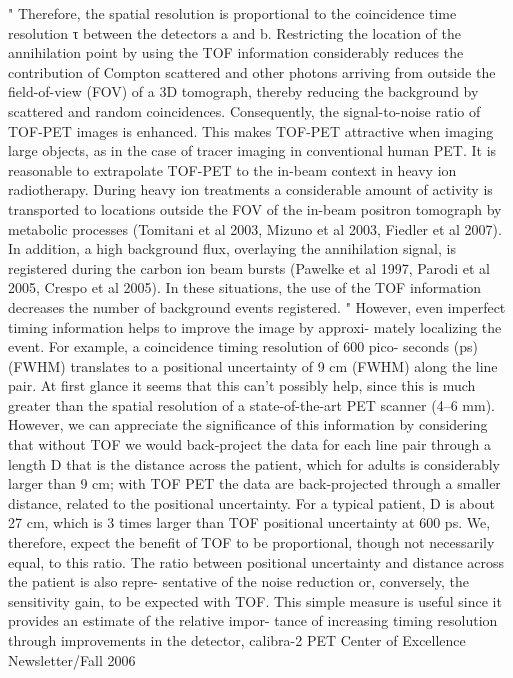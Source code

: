 " Therefore, the spatial
resolution is proportional to the coincidence time resolution τ between the detectors a and b.
Restricting the location of the annihilation point by using the TOF information considerably
reduces the contribution of Compton scattered and other photons arriving from outside the
field-of-view (FOV) of a 3D tomograph, thereby reducing the background by scattered and
random coincidences. Consequently, the signal-to-noise ratio of TOF-PET images is enhanced.
This makes TOF-PET attractive when imaging large objects, as in the case of tracer imaging
in conventional human PET. It is reasonable to extrapolate TOF-PET to the in-beam context
in heavy ion radiotherapy. During heavy ion treatments a considerable amount of activity
is transported to locations outside the FOV of the in-beam positron tomograph by metabolic
processes (Tomitani et al 2003, Mizuno et al 2003, Fiedler et al 2007). In addition, a high
background flux, overlaying the annihilation signal, is registered during the carbon ion beam
bursts (Pawelke et al 1997, Parodi et al 2005, Crespo et al 2005). In these situations, the use
of the TOF information decreases the number of background events registered.
"
However, even imperfect timing information helps to improve the image by approxi-
mately localizing the event. For example, a coincidence timing resolution of 600 pico-
seconds (ps) (FWHM) translates to a positional uncertainty of 9 cm (FWHM) along the
line pair. At first glance it seems that this can’t possibly help, since this is much greater
than the spatial resolution of a state-of-the-art PET scanner (4–6 mm). However, we
can appreciate the significance of this information by considering that without TOF we
would back-project the data for each line pair through a length D that is the distance
across the patient, which for adults is considerably larger than 9 cm; with TOF PET the
data are back-projected through a smaller distance, related to the positional uncertainty.
For a typical patient, D is about 27 cm, which is 3 times larger than TOF positional
uncertainty at 600 ps. We, therefore, expect the benefit of TOF to be proportional,
though not necessarily equal, to this ratio.
The ratio between positional uncertainty and distance across the patient is also repre-
sentative of the noise reduction or, conversely, the sensitivity gain, to be expected with
TOF. This simple measure is useful since it provides an estimate of the relative impor-
tance of increasing timing resolution through improvements in the detector, calibra-2
PET Center of Excellence Newsletter/Fall 2006
